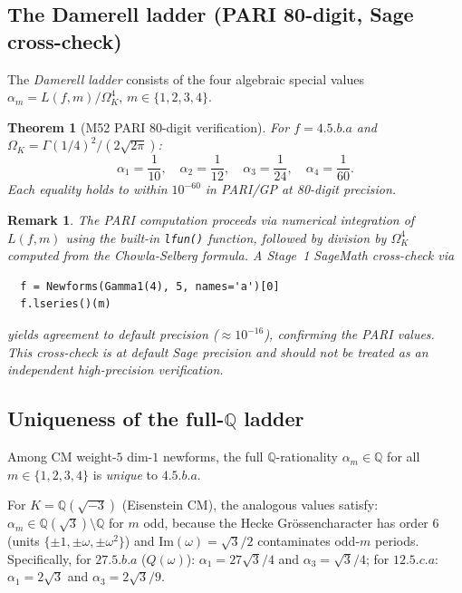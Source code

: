 \documentclass[12pt]{amsart}
\newtheorem{theorem}[conjecture]{Theorem}
\newtheorem{remark}[conjecture]{Remark}
\theoremstyle{definition}
\newcommand{\Q}{\mathbb{Q}}
\begin{document}
\subsection{The Damerell ladder (PARI 80-digit, Sage cross-check)}

The \emph{Damerell ladder} consists of the four algebraic special values
$\alpha_m = L(f,m)/\Omega_K^4$, $m \in \{1,2,3,4\}$.

\begin{theorem}[M52 PARI 80-digit verification]
\label{thm:damerell}
For $f = 4.5.b.a$ and $\Omega_K = \Gamma(1/4)^2/(2\sqrt{2\pi})$:
\[
  \alpha_1 = \frac{1}{10}, \quad
  \alpha_2 = \frac{1}{12}, \quad
  \alpha_3 = \frac{1}{24}, \quad
  \alpha_4 = \frac{1}{60}.
\]
Each equality holds to within $10^{-60}$ in PARI/GP at 80-digit precision.
\end{theorem}

\begin{remark}
The PARI computation proceeds via numerical integration of $L(f,m)$
using the built-in \verb|lfun()| function, followed by division by
$\Omega_K^4$ computed from the Chowla-Selberg formula.
A Stage~1 SageMath cross-check via
\begin{verbatim}
  f = Newforms(Gamma1(4), 5, names='a')[0]
  f.lseries()(m)
\end{verbatim}
yields agreement to default precision ($\approx 10^{-16}$),
confirming the PARI values. This cross-check is at default
Sage precision and should not be treated as an independent high-precision verification.
\end{remark}

\subsection{Uniqueness of the full-\texorpdfstring{$\Q$}{Q} ladder}

Among CM weight-$5$ dim-$1$ newforms, the full $\Q$-rationality
$\alpha_m \in \Q$ for all $m \in \{1,2,3,4\}$ is \emph{unique} to $4.5.b.a$.

For $K = \Q(\sqrt{-3})$ (Eisenstein CM), the analogous values satisfy:
$\alpha_m \in \Q(\sqrt{3}) \setminus \Q$ for $m$ odd, because the
Hecke Grössencharacter has order $6$ (units $\{\pm 1, \pm\omega, \pm\omega^2\}$)
and $\mathrm{Im}(\omega) = \sqrt{3}/2$ contaminates odd-$m$ periods.
Specifically, for $27.5.b.a$ ($Q(\omega)$): $\alpha_1 = 27\sqrt{3}/4$ and
$\alpha_3 = \sqrt{3}/4$; for $12.5.c.a$: $\alpha_1 = 2\sqrt{3}$ and
$\alpha_3 = 2\sqrt{3}/9$.
\end{document}
